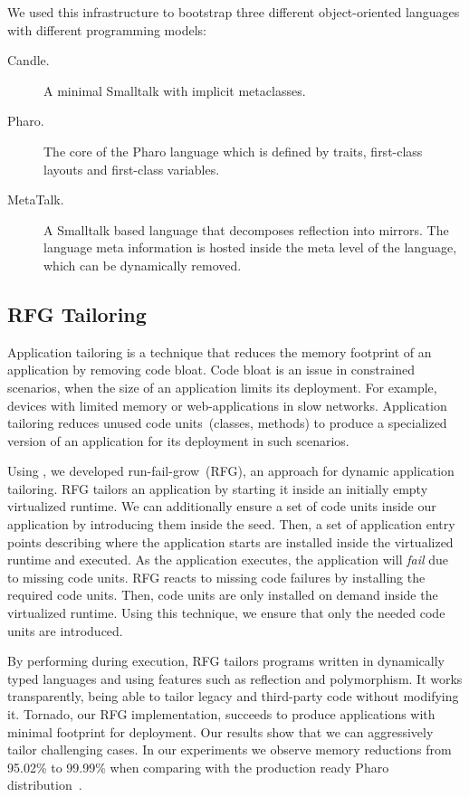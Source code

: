 We used this infrastructure to bootstrap three different object-oriented languages with different programming models: 
\begin{description}
\item[Candle.] A minimal Smalltalk with implicit metaclasses.
\item[Pharo.] The core of the Pharo language which is defined by traits, first-class layouts and first-class variables.
\item[MetaTalk.] A Smalltalk based language that decomposes reflection into mirrors. The language meta information is hosted inside the meta level of the language, which can be dynamically removed.
\end{description}

\subsection{RFG Tailoring} 

Application tailoring is a technique that reduces the memory footprint of an application by removing code bloat. Code bloat is an issue in constrained scenarios, when the size of an application limits its deployment. For example, devices with limited memory or web-applications in slow networks. Application tailoring reduces unused code units~(\eg classes, methods) to produce a specialized version of an application for its deployment in such scenarios.

Using \Vtt, we developed run-fail-grow~(RFG), an approach for dynamic application tailoring. RFG tailors an application by starting it inside an initially empty virtualized runtime. We can additionally ensure a set of code units inside our application by introducing them inside the seed. Then, a set of application entry points describing where the application starts are installed inside the virtualized runtime and executed. As the application executes, the application will \emph{fail} due to missing code units. RFG reacts to missing code failures by installing the required code units. Then, code units are only installed on demand inside the virtualized runtime. Using this technique, we ensure that only the needed code units are introduced.

By performing during execution, RFG tailors programs written in dynamically typed languages and using features such as reflection and polymorphism. It works transparently, being able to tailor legacy and third-party code without modifying it. Tornado, our RFG implementation, succeeds to produce applications with minimal footprint for deployment. Our results show that we can aggressively tailor challenging cases. In our experiments we observe memory reductions from 95.02\% to 99.99\% when comparing with the production ready Pharo distribution~\cite{Poli14a}.

